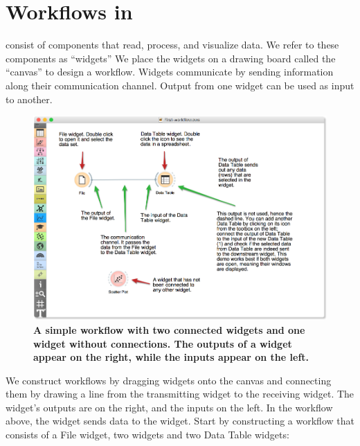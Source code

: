 \chapter{Workflows in \mutation}
\label{ch:workflows}

 consist of components that read, process, and visualize data. We refer to these components as ``widgets'' We place the widgets on a drawing board called the ``canvas'' to design a workflow. Widgets communicate by sending information along their communication channel. Output from one widget can be used as input to another.

\begin{figure}[h]
  \includegraphics[width=\linewidth]{workflow-fig1.png}%
  \caption{\textbf{\textsf{A simple workflow with two connected widgets and one widget without connections. The outputs of a widget appear on the right, while the inputs appear on the left.}}}
  \label{fig:workflow-fig1}
\end{figure}

We construct workflows by dragging widgets onto the canvas and connecting them by drawing a line from the transmitting widget to the receiving widget. The widget's outputs are on the right, and the inputs on the left. In the workflow above, the  widget sends data to the  widget.
\newpage
Start by constructing a workflow that consists of a File widget, two  widgets and two Data Table widgets:

